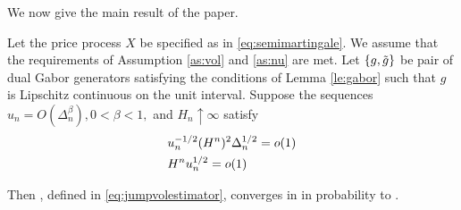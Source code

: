 \begin{comment}
First, we state some obvious results.
\begin{lem}
 Let the price process  $X$ be specified as in  \eqref{eq:semimartingale}. Then,
 \begin{enumerate}
   \item $(x^2 \wedge 1) \ast \mu$ is locally integrable.
   \item $(\vert x \vert I_{\{\vert x \vert > 1\}}) \ast \mu$ is locally integrable.
 \end{enumerate}
\end{lem}
The first statement follows because $(x^2 \wedge 1) \ast \mu_t$ is dominated by $ (x^2I_{\{\vert x \vert \le 1\}}) \ast \mu_t$ and $ (I_{\{\vert x \vert > 1\}}) \ast \mu_t$, which  are increasing processes with bounded jumps and, therefore, locally integrable.    
\end{comment}
We now give the main result of the paper.
\begin{prop} \label{pro:infinity}
  Let the price process  $X$ be specified as in  \eqref{eq:semimartingale}. We assume that the requirements of Assumption \ref{as:vol} and \ref{as:nu} are met. Let $\{g, \tilde{g}\}$ be pair of dual Gabor generators satisfying the conditions of Lemma \eqref{le:gabor} such that $g$ is Lipschitz continuous on the unit interval.
  Suppose the sequences $u_n = O(\Delta_n^\beta), 0 <\beta<1 ,$ and $H_n \uparrow \infty$ satisfy 
  \begin{align}
    &u_n^{-1/2}(H^n)^2\Delta_n^{1/2} = o(1)\notag\\
    &H^nu^{1/2}_n = o(1)\notag
    \label{}
  \end{align} 
  \begin{comment}and   that $\nu$ satisfies 
   \begin{align}
    (x^2 \wedge u_n^{1/2}) \ast \nu_1 = o(H_n^{-2}).
    \label{eq:smallo}
  \end{align}
  \end{comment}
  Then  \jvn, defined in \eqref{eq:jumpvolestimator}, converges in \Ltwo in probability to \sv.
\end{prop}
